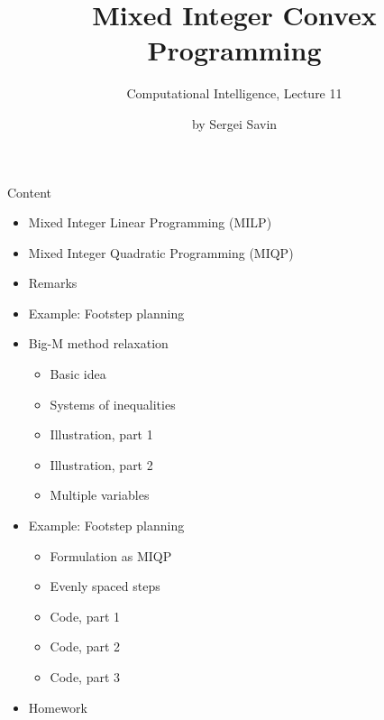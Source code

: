 \documentclass{beamer}
\title{Mixed Integer Convex Programming}
\subtitle{Computational Intelligence, Lecture 11}
\author{by Sergei Savin}
\date{\mydate}
\begin{document}
\maketitle


\begin{frame}{Content}

\begin{itemize}
\item Mixed Integer Linear Programming (MILP)
\item Mixed Integer Quadratic Programming (MIQP)
\item Remarks
\item Example: Footstep planning
\item Big-M method relaxation
\begin{itemize}
    \item Basic idea
    \item Systems of inequalities
    \item Illustration, part 1
    \item Illustration, part 2
    \item Multiple variables
\end{itemize}
\item  Example: Footstep planning
\begin{itemize}
    \item Formulation as MIQP
    \item Evenly spaced steps
    \item Code, part 1
    \item Code, part 2
    \item Code, part 3
\end{itemize}
\item Homework
\end{itemize}

\end{frame}
\end{document}

